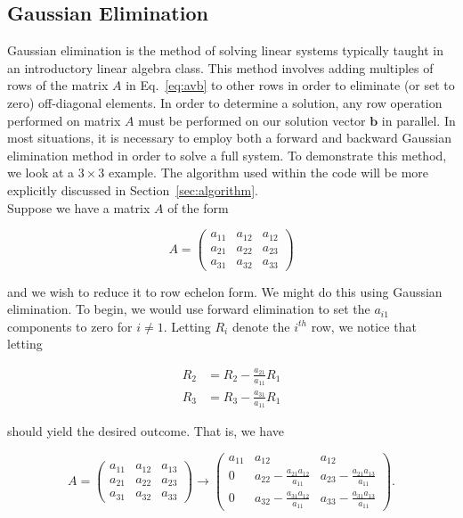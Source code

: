 \documentclass[12pt]{article}
\numberwithin{equation}{section}
\begin{document}
\subsection{Gaussian Elimination}
\label{subsec:gausselim}

Gaussian elimination is the method of solving linear systems typically taught in an introductory linear algebra class. This method involves adding multiples of rows of the matrix $A$ in Eq.~\ref{eq:avb} to other rows in order to eliminate (or set to zero) off-diagonal elements.  In order to determine a solution, any row operation performed on matrix $A$ must be performed on our solution vector $\textbf{b}$ in parallel.  In most situations, it is necessary to employ both a forward and backward Gaussian elimination method in order to solve a full system.  To demonstrate this method, we look at a $3\times 3$ example.  The algorithm used within the code will be more explicitly discussed in Section~\ref{sec:algorithm}.
\\\indent Suppose we have a matrix $A$ of the form

\begin{equation}
\label{eq:ainit}
A = \left(
\begin{array}{ccc}
a_{11} & a_{12} & a_{12} \\
a_{21} & a_{22} & a_{23} \\
a_{31} & a_{32} & a_{33}
\end{array}
\right)
\end{equation}

\noindent and we wish to reduce it to row echelon form.  We might do this using Gaussian elimination.  To begin, we would use forward elimination to set the $a_{i1}$ components to zero for $i\neq1$.  Letting $R_{i}$ denote the $i^{th}$ row, we notice that letting 

\begin{equation}
\label{eq:rowops1}
\begin{align}
R_{2} & = R_{2} - \frac{a_{21}}{a_{11}}R_{1} \\
R_{3} & = R_{3} - \frac{a_{31}}{a_{11}}R_{1}
\end{align}
\end{equation}

\noindent should yield the desired outcome.  That is, we have 

$$A = \left(
\begin{array}{ccc}
a_{11} & a_{12} & a_{13} \\
a_{21} & a_{22} & a_{23} \\
a_{31} & a_{32} & a_{33}
\end{array}
\right) \rightarrow \left(
\begin{array}{ccc}
a_{11} & a_{12} & a_{12} \\
0 & a_{22} - \frac{a_{21}a_{12}}{a_{11}} & a_{23} - \frac{a_{21}a_{13}}{a_{11}} \\
0 & a_{32} - \frac{a_{31}a_{12}}{a_{11}} & a_{33} - \frac{a_{31}a_{13}}{a_{11}}
\end{array}\right).$$
\end{document}
